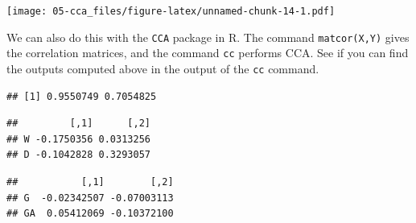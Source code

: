 \documentclass[
]{book}
\newenvironment{Shaded}{\begin{snugshade}}{\end{snugshade}}
\newcommand{\CommentTok}[1]{\textcolor[rgb]{0.56,0.35,0.01}{\textit{#1}}}
\newcommand{\FunctionTok}[1]{\textcolor[rgb]{0.13,0.29,0.53}{\textbf{#1}}}
\newcommand{\NormalTok}[1]{#1}
\newcommand{\OtherTok}[1]{\textcolor[rgb]{0.56,0.35,0.01}{#1}}
\newcommand{\SpecialCharTok}[1]{\textcolor[rgb]{0.81,0.36,0.00}{\textbf{#1}}}
\theoremstyle{definition}
\theoremstyle{definition}
\theoremstyle{definition}
\theoremstyle{definition}
\theoremstyle{remark}
\begin{document}
\texttt{[image: 05-cca\_files/figure-latex/unnamed-chunk-14-1.pdf]}

We can also do this with the \texttt{CCA} package in R. The command \texttt{matcor(X,Y)} gives the correlation matrices, and the command \texttt{cc} performs CCA. See if you can find the outputs computed above in the output of the \texttt{cc} command.

\begin{Shaded}
\end{Shaded}

\begin{verbatim}
## [1] 0.9550749 0.7054825
\end{verbatim}

\begin{Shaded}
\end{Shaded}

\begin{verbatim}
##         [,1]      [,2]
## W -0.1750356 0.0313256
## D -0.1042828 0.3293057
\end{verbatim}

\begin{Shaded}
\end{Shaded}

\begin{verbatim}
##           [,1]        [,2]
## G  -0.02342507 -0.07003113
## GA  0.05412069 -0.10372100
\end{verbatim}

\begin{Shaded}
\end{Shaded}
\end{document}
